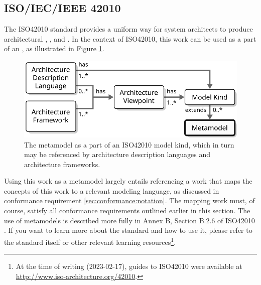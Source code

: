 \newpage

\subsection{ISO/IEC/IEEE 42010}
\label{sec:conformance:iso42010}

The ISO42010 \cite{iso42010} standard provides a uniform way for system architects to produce architectural , ,  and .
In the context of ISO42010, this work can be used as a  part of an , as illustrated in Figure \ref{fig:iso42010}.

\begin{figure}[ht!]
  \centering
  \includegraphics[scale=0.9]{figures/iso42010}
  \caption{
    The metamodel as a part of an ISO42010 model kind, which in turn may be referenced by architecture description languages and architecture frameworks.
  }
  \label{fig:iso42010}
\end{figure}

Using this work as a metamodel largely entails referencing a work that maps the concepts of this work to a relevant modeling language, as discussed in conformance requirement \ref{sec:conformance:notation}.
The mapping work must, of course, satisfy all conformance requirements outlined earlier in this section.
The use of metamodels is described more fully in Annex B, Section B.2.6 of ISO42010 \cite{iso42010}.
If you want to learn more about the standard and how to use it, please refer to the standard itself or other relevant learning resources\footnote{At the time of writing (2023-02-17), guides to ISO42010 were available at \url{http://www.iso-architecture.org/42010}.}.